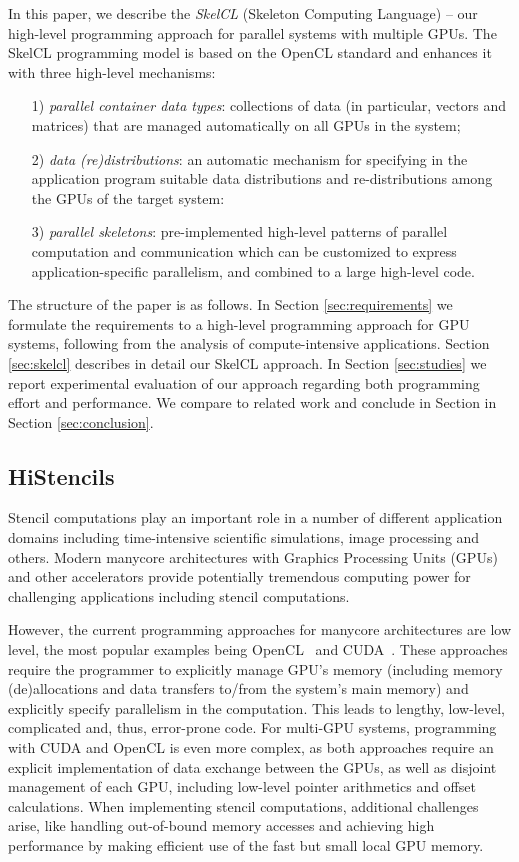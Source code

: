 In this paper, we describe the \emph{SkelCL} (Skeleton Computing Language) -- our high-level programming approach for parallel systems with multiple GPUs.
The SkelCL programming model is based on the OpenCL standard and enhances it with three high-level mechanisms:
\begin{itemize}
  \item[1)] \emph{parallel container data types}: collections of data (in particular, vectors and matrices) that are managed automatically on all GPUs in the system;
  \item[2)] \emph{data (re)distributions}: an automatic mechanism for specifying in the application program suitable data distributions and re-distributions among the GPUs of the target system:
  \item[3)] \emph{parallel skeletons}: pre-implemented high-level patterns of parallel computation and communication which can be customized to express application-specific parallelism, and combined to a large high-level code.
\end{itemize}
The structure of the paper is as follows. 
In Section \ref{sec:requirements} we formulate the requirements to a high-level programming approach for GPU systems, following from the analysis of compute-intensive applications. 
Section \ref{sec:skelcl} describes in detail our SkelCL approach. 
In Section \ref{sec:studies} we report experimental evaluation of our approach regarding both programming effort and performance. 
We compare to related work and conclude in Section in Section \ref{sec:conclusion}. 

\subsection{HiStencils}
Stencil computations play an important role in a number of different application domains including time-intensive scientific simulations, image processing and others.
Modern manycore architectures with Graphics Processing Units (GPUs) and other accelerators provide potentially tremendous computing power for challenging applications including stencil computations.

However, the current programming approaches for manycore architectures are low level, the most popular examples being OpenCL~\cite{OpenCL} and CUDA~\cite{CUDA}.
These approaches require the programmer to explicitly manage GPU's memory (including memory (de)allocations and data transfers to/from the system's main memory) and explicitly specify parallelism in the computation.
This leads to lengthy, low-level, complicated and, thus, error-prone code.
For multi-GPU systems, programming with CUDA and OpenCL is even more complex, as both approaches require an explicit implementation of data exchange between the GPUs, as well as disjoint management of each GPU, including low-level pointer arithmetics and offset calculations.
When implementing stencil computations, additional challenges arise, like handling out-of-bound memory accesses and achieving high performance by making efficient use of the fast but small local GPU memory.

